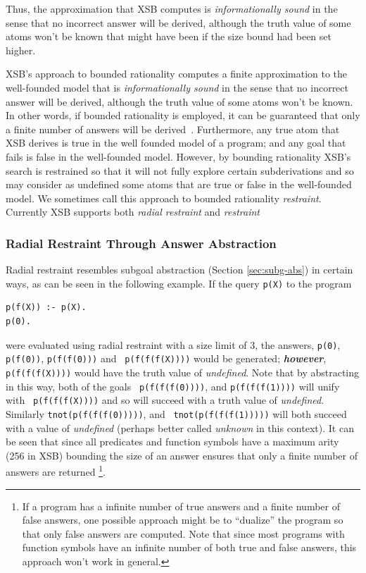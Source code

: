 Thus, the approximation that XSB computes is {\em
  informationally sound} in the sense that no incorrect answer will be
derived, although the truth value of some atoms won't be known that
might have been if the size bound had been set higher.  

XSB's approach to bounded rationality computes a finite approximation
to the well-founded model that is {\em informationally sound} in the
sense that no incorrect answer will be derived, although the truth
value of some atoms won't be known. In other words, if bounded
rationality is employed, it can be guaranteed that only a finite
number of answers will be derived~\cite{GroS13}.  Furthermore, any
true atom that XSB derives is true in the well founded model of a
program; and any goal that fails is false in the well-founded model.
However, by bounding rationality XSB's search is restrained so that it
will not fully explore certain subderivations and so may consider as
undefined some atoms that are true or false in the well-founded model.
We sometimes call this approach to bounded rationality {\em
  restraint}.  Currently XSB supports both {\em radial restraint} and
{\em \maxans{} restraint}

\subsubsection{Radial Restraint Through Answer Abstraction}
Radial restraint resembles subgoal abstraction (Section
\ref{sec:subg-abs}) in certain ways, as can be seen in the following
example. If the query {\tt p(X)} to the program
%
\begin{verbatim}
p(f(X)) :- p(X).  
p(0).
\end{verbatim}
%
were evaluated using radial restraint with a size limit of 3, the
answers, {\tt p(0)}, {\tt p(f(0))}, {\tt p(f(f(0)))} and {\tt
  p(f(f(f(X))))} would be generated; {\bf {\em however}}, {\tt
  p(f(f(f(X))))} would have the truth value of {\em undefined}.  Note
that by abstracting in this way, both of the goals {\tt
  p(f(f(f(0))))}, and {\tt p(f(f(f(1))))} will unify with {\tt
  p(f(f(f(X))))} and so will succeed with a truth value of {\em
  undefined}.  Similarly {\tt tnot(p(f(f(f(0)))))}, and {\tt
  tnot(p(f(f(f(1)))))} will both succeed with a value of {\em
  undefined} (perhaps better called {\em unknown} in this context).
%
It can be seen that since all predicates and function symbols have a
maximum arity (256 in XSB) bounding the size of an answer ensures that
only a finite number of answers are returned
\footnote{If a program has a infinite number of true answers and a
  finite number of false answers, one possible approach might be to
  ``dualize'' the program so that only false answers are computed.
  Note that since most programs with function symbols have an infinite
  number of both true and false answers, this approach won't work in
  general.}.

